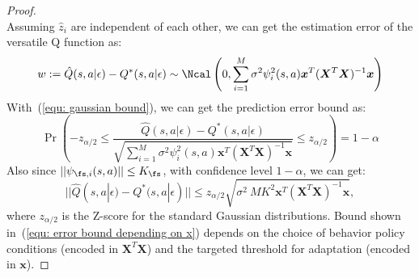 \begin{proof}
\begin{equation}
\end{equation}
Assuming $\hat{z}_i$ are independent of each other, we can get the estimation error of the versatile Q function as:
\begin{equation}
\label{equ: gaussian bound}
    w := \hat{Q}(s, a|\epsilon) - Q^*(s, a|\epsilon) \sim \Ncal\left(0, \sum_{i=1}^{M} \sigma^2\psi_{i}^2(s, a) \boldsymbol{x}^T (\boldsymbol{X}^T \boldsymbol{X})^{-1} \boldsymbol{x}\right)
\end{equation}
With~(\ref{equ: gaussian bound}), we can get the prediction error bound as:
\begin{equation}
\label{equ: gaussian prediction interval}
    \Pr \left( -z_{{\alpha} / {2}} \leq \frac{\hat{Q}(s, a|\epsilon) - Q^*(s, a|\epsilon)}{ \sqrt{\sum_{i=1}^{M} \sigma^2\psi_{i}^2(s, a) \boldsymbol{x}^T (\boldsymbol{X}^T \boldsymbol{X})^{-1} \boldsymbol{x}} } \leq z_{{\alpha} / {2}} \right) = 1 - \alpha 
\end{equation}
Also since $||\psi_{\fs, i}(s, a)|| \leq K_\fs$, with confidence level $1-\alpha$, we can get:
\begin{equation}
\label{equ: error bound depending on x}
    ||\hat{Q}(s, a|\epsilon) - Q^*(s, a|\epsilon)|| \leq z_{\alpha/2} \sqrt{ \sigma^2 \ M K^2 \boldsymbol{x}^T (\boldsymbol{X}^T \boldsymbol{X})^{-1} \boldsymbol{x}},
\end{equation}
where $z_{\alpha/2}$ is the Z-score for the standard Gaussian distributions. Bound shown in~(\ref{equ: error bound depending on x}) depends on the choice of behavior policy conditions (encoded in $\boldsymbol{X}^T \boldsymbol{X}$) and the targeted threshold for adaptation (encoded in $\boldsymbol{x}$).


\end{proof}
